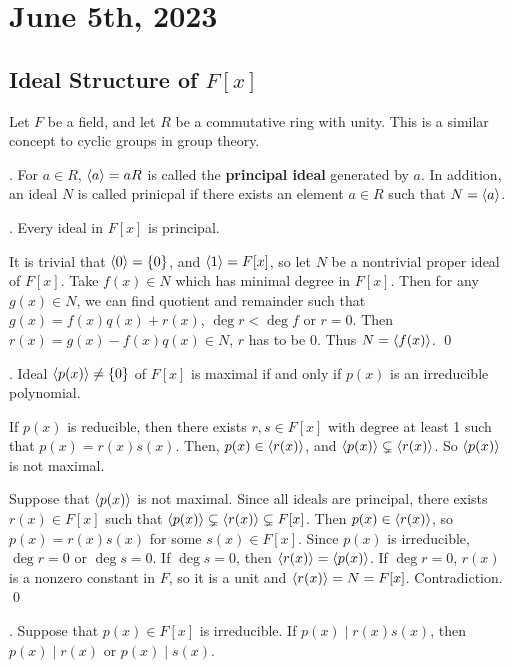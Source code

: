 \section*{June 5th, 2023}

\subsection*{Ideal Structure of \(F[x]\)}

Let \(F\) be a field, and let \(R\) be a commutative ring with unity. This is a similar concept to cyclic groups in group theory.

.  For \(a \in R\), \(\left\langle a \right\rangle = aR\) is called the \textbf{principal ideal} generated by \(a\). In addition, an ideal \(N\) is called prinicpal if there exists an element \(a \in R\) such that \(N = \left\langle a \right\rangle\).

\thm. Every ideal in \(F[x]\) is principal.

\pf It is trivial that \(\left\langle 0 \right\rangle = \{0\}\), and \(\left\langle 1 \right\rangle = F[x]\), so let \(N\) be a nontrivial proper ideal of \(F[x]\). Take \(f(x) \in N\) which has minimal degree in \(F[x]\). Then for any \(g(x) \in N\), we can find quotient and remainder such that \(g(x) = f(x)q(x) + r(x)\), \(\deg r < \deg f\) or \(r = 0\). Then \(r(x) = g(x) - f(x)q(x) \in N\), \(r\) has to be \(0\). Thus \(N = \left\langle f(x) \right\rangle\). \qed

\thm. Ideal \(\left\langle p(x) \right\rangle \neq \{0\}\) of \(F[x]\) is maximal if and only if \(p(x)\) is an irreducible polynomial.

\pf \note{\mimp} If \(p(x)\) is reducible, then there exists \(r, s \in F[x]\) with degree at least 1 such that \(p(x) = r(x)s(x)\). Then, \(p(x) \in \left\langle r(x) \right\rangle\), and \(\left\langle p(x) \right\rangle \subsetneq \left\langle r(x) \right\rangle\). So \(\left\langle p(x) \right\rangle\) is not maximal.

\note{\mimpd} Suppose that \(\left\langle p(x) \right\rangle\) is not maximal. Since all ideals are principal, there exists \(r(x) \in F[x]\) such that \(\left\langle p(x) \right\rangle \subsetneq \left\langle r(x) \right\rangle \subsetneq F[x]\). Then \(p(x) \in \left\langle r(x) \right\rangle\), so \(p(x) = r(x)s(x)\) for some \(s(x) \in F[x]\). Since \(p(x)\) is irreducible, \(\deg r = 0\) or \(\deg s = 0\). If \(\deg s = 0\), then \(\left\langle r(x) \right\rangle = \left\langle p(x) \right\rangle\). If \(\deg r = 0\), \(r(x)\) is a nonzero constant in \(F\), so it is a unit and \(\left\langle r(x) \right\rangle = N = F[x]\). Contradiction. \qed

\thm. Suppose that \(p(x) \in F[x]\) is irreducible. If \(p(x) \mid r(x)s(x)\), then \(p(x) \mid r(x)\) or \(p(x) \mid s(x)\).

